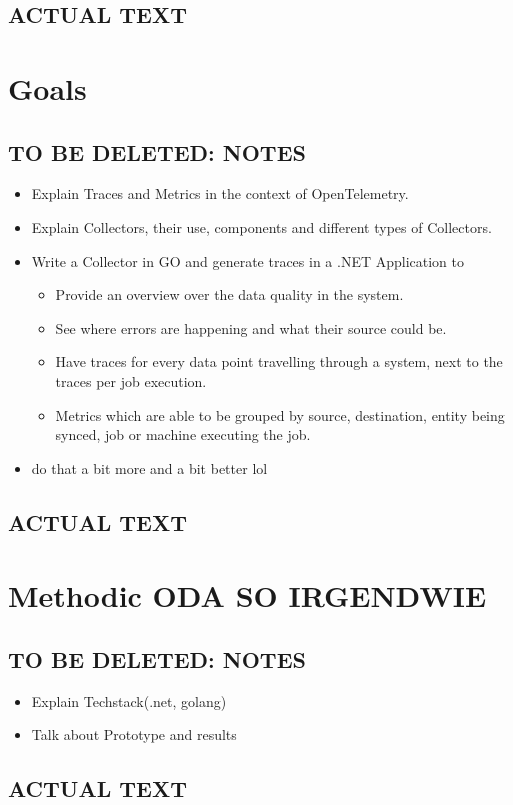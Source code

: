 \subsection{ACTUAL TEXT}

\section{Goals}

\subsection{TO BE DELETED: NOTES}

\begin{itemize}
	\item Explain Traces and Metrics in the context of OpenTelemetry.
	\item Explain Collectors, their use, components and different types of Collectors.
	\item Write a Collector in GO and generate traces in a .NET Application to
	      \begin{itemize}
		      \item Provide an overview over the data quality in the system.
		      \item See where errors are happening and what their source could be.
		      \item Have traces for every data point travelling through a system, next to the traces per job execution.
		      \item Metrics which are able to be grouped by source, destination, entity being synced, job or machine executing the job.
	      \end{itemize}
	\item do that a bit more and a bit better lol
\end{itemize}

\subsection{ACTUAL TEXT}

\section{Methodic ODA SO IRGENDWIE}

\subsection{TO BE DELETED: NOTES}

\begin{itemize}
	\item Explain Techstack(.net, golang)
	\item Talk about Prototype and results
\end{itemize}

\subsection{ACTUAL TEXT}
